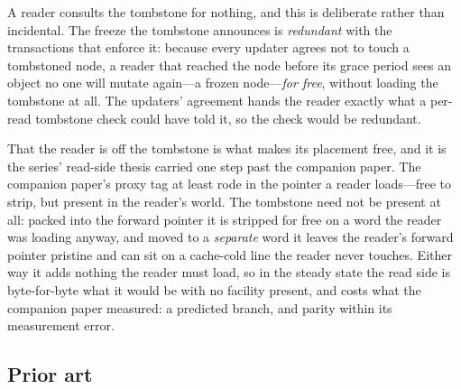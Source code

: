 \documentclass[11pt]{article}
\begin{document}
A reader consults the tombstone for nothing, and this is deliberate rather than
incidental. The freeze the tombstone announces is \emph{redundant} with the
transactions that enforce it: because every updater agrees not to touch a
tombstoned node, a reader that reached the node before its grace period sees an
object no one will mutate again---a frozen node---\emph{for free}, without loading
the tombstone at all. The updaters' agreement hands the reader exactly what a
per-read tombstone check could have told it, so the check would be redundant.

That the reader is off the tombstone is what makes its placement free, and it is
the series' read-side thesis carried one step past the companion paper. The
companion paper's proxy tag at least rode in the pointer a reader loads---free to
strip, but present in the reader's world. The tombstone need not be present at
all: packed into the forward pointer it is stripped for free on a word the reader
was loading anyway, and moved to a \emph{separate} word it leaves the reader's
forward pointer pristine and can sit on a cache-cold line the reader never
touches. Either way it adds nothing the reader must load, so in the steady state
the read side is byte-for-byte what it would be with no facility present, and
costs what the companion paper measured: a predicted branch, and parity within
its measurement error.

\subsection{Prior art}
\label{sec:tombstoneclaim}

\end{document}
